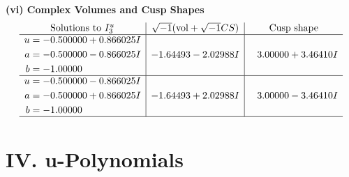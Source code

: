 \documentclass[1p]{elsarticle_modified}
\theoremstyle{definition}
\newcommand{\I}{\sqrt{-1}}
\begin{document}
\newpage\flushleft \textbf{(vi) Complex Volumes and Cusp Shapes}
$$\begin{array}{c|c|c}  
\text{Solutions to }I^u_{3}& \I (\text{vol} + \sqrt{-1}CS) & \text{Cusp shape}\\
 \hline 
\begin{aligned}
u &= -0.500000 + 0.866025 I \\
a &= -0.500000 - 0.866025 I \\
b &= -1.00000\phantom{ +0.000000I}\end{aligned}
 & -1.64493 - 2.02988 I & \phantom{-}3.00000 + 3.46410 I \\ \hline\begin{aligned}
u &= -0.500000 - 0.866025 I \\
a &= -0.500000 + 0.866025 I \\
b &= -1.00000\phantom{ +0.000000I}\end{aligned}
 & -1.64493 + 2.02988 I & \phantom{-}3.00000 - 3.46410 I\\
 \hline 
 \end{array}$$\newpage
\newpage\renewcommand{\arraystretch}{1}
\centering \section*{ IV. u-Polynomials}
\end{document}
